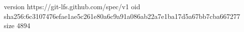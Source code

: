 version https://git-lfs.github.com/spec/v1
oid sha256:6c3107476efae1ae5c261e80a6c9a91a086ab22a7e1ba17d5a67bb7cba667277
size 4894
